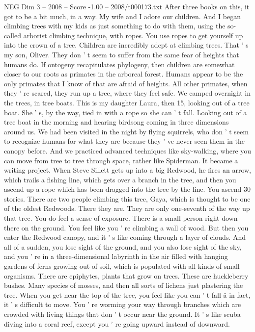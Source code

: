 \begin{textsample}{NEG Dim 3 – 2008 – Score -1.00 – 2008/t000173.txt}
After three books on this, it got to be a bit much, in a way.
My wife and I adore our children.
And I began climbing trees with my kids as just something to do with them, using the so-called arborist climbing technique, with ropes.
You use ropes to get yourself up into the crown of a tree.
Children are incredibly adept at climbing trees.
That ' s my son, Oliver.
They don ' t seem to suffer from the same fear of heights that humans do.
If ontogeny recapitulates phylogeny, then children are somewhat closer to our roots as primates in the arboreal forest.
Humans appear to be the only primates that I know of that are afraid of heights.
All other primates, when they ' re scared, they run up a tree, where they feel safe.
We camped overnight in the trees, in tree boats.
This is my daughter Laura, then 15, looking out of a tree boat.
She ' s, by the way, tied in with a rope so she can ' t fall.
Looking out of a tree boat in the morning and hearing birdsong coming in three dimensions around us.
We had been visited in the night by flying squirrels, who don ' t seem to recognize humans for what they are because they ' ve never seen them in the canopy before.
And we practiced advanced techniques like sky-walking, where you can move from tree to tree through space, rather like Spiderman.
It became a writing project.
When Steve Sillett gets up into a big Redwood, he fires an arrow, which trails a fishing line, which gets over a branch in the tree, and then you ascend up a rope which has been dragged into the tree by the line.
You ascend 30 stories.
There are two people climbing this tree, Gaya, which is thought to be one of the oldest Redwoods.
There they are.
They are only one-seventh of the way up that tree.
You do feel a sense of exposure.
There is a small person right down there on the ground.
You feel like you ' re climbing a wall of wood.
But then you enter the Redwood canopy, and it ' s like coming through a layer of clouds.
And all of a sudden, you lose sight of the ground, and you also lose sight of the sky, and you ' re in a three-dimensional labyrinth in the air filled with hanging gardens of ferns growing out of soil, which is populated with all kinds of small organisms.
There are epiphytes, plants that grow on trees.
These are huckleberry bushes.
Many species of mosses, and then all sorts of lichens just plastering the tree.
When you get near the top of the tree, you feel like you can ' t fall â in fact, it ' s difficult to move.
You ' re worming your way through branches which are crowded with living things that don ' t occur near the ground.
It ' s like scuba diving into a coral reef, except you ' re going upward instead of downward.

\end{textsample}
